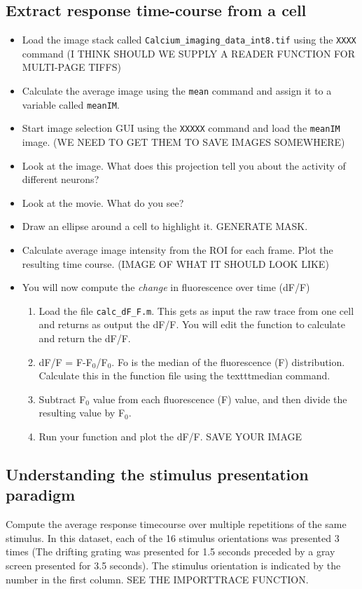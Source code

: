 \documentclass[paper=a4, fontsize=11pt]{scrartcl} %
\numberwithin{equation}{section} %
\numberwithin{figure}{section} %
\numberwithin{table}{section} %
\newcommand{\sub}[1]{\ensuremath{_{#1}}}
\begin{document}
\subsection{Extract response time-course from a cell}
\begin{itemize}
\item Load the image stack called \texttt{Calcium\_imaging\_data\_int8.tif} using the \texttt{XXXX} command (I THINK SHOULD WE SUPPLY A
READER FUNCTION FOR MULTI-PAGE TIFFS)
\item Calculate the average image using the \texttt{mean} command and assign it to a variable called \texttt{meanIM}.
\item Start image selection GUI using the \texttt{XXXXX} command and load the \texttt{meanIM} image. (WE NEED TO GET THEM TO SAVE IMAGES SOMEWHERE)
\item Look at the image. What does this projection tell you about the activity of different neurons?
\item Look at the movie. What do you see?
\item Draw an ellipse around a cell to highlight it. GENERATE MASK.
\item Calculate average image intensity from the ROI for each frame. Plot the resulting time course. (IMAGE OF WHAT IT SHOULD LOOK LIKE)
\item You will now compute the \textit{change} in fluorescence over time (dF/F)
	\begin{enumerate}
	\item Load the file  \texttt{calc\_dF\_F.m}. This gets as input the raw trace from one cell and returns as output the dF/F. You will edit
	the function to calculate and return the dF/F.
	\item dF/F = F-F\sub{0}/F\sub{0}. Fo is the median of the fluorescence (F) distribution. Calculate this in the function file using the texttt{median} command.
	\item Subtract F\sub{0} value from each fluorescence (F) value, and then divide the resulting value by F\sub{0}. 	
	\item Run your function and plot the dF/F. SAVE YOUR IMAGE
	\end{enumerate}
\end{itemize}


\subsection{Understanding the stimulus presentation paradigm}
Compute the average response timecourse over multiple repetitions of the same stimulus. In this dataset, each of the 16 stimulus orientations was presented 3 times (The drifting grating was presented for 1.5 seconds preceded by a gray screen presented for 3.5 seconds). The stimulus orientation is indicated by the number in the first column. SEE THE IMPORTTRACE FUNCTION. 
\end{document}
